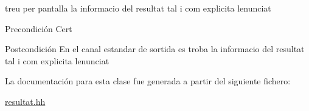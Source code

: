 treu per pantalla la informacio del resultat tal i com explicita l\textquotesingle{}enunciat 

\begin{DoxyPrecond}{Precondición}
Cert 
\end{DoxyPrecond}
\begin{DoxyPostcond}{Postcondición}
En el canal estandar de sortida es troba la informacio del resultat tal i com explicita l\textquotesingle{}enunciat 
\end{DoxyPostcond}


La documentación para esta clase fue generada a partir del siguiente fichero\+:\begin{DoxyCompactItemize}
\item 
\hyperlink{resultat_8hh}{resultat.\+hh}\end{DoxyCompactItemize}
